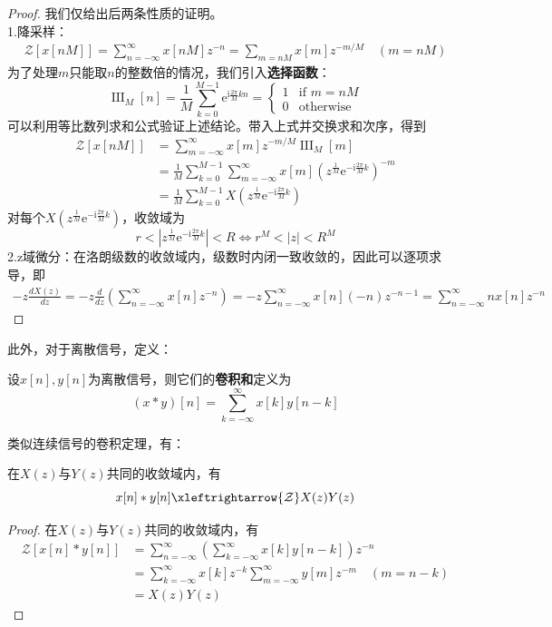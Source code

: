 \documentclass{ctexbook}
\newcommand{\shah}{\operatorname{III}}
\begin{document}
\begin{proof}
    我们仅给出后两条性质的证明。\\
    1.降采样：
    \begin{align*}
        \mathcal{Z}\left[x[nM]\right]=\sum_{n=-\infty}^{\infty}x[nM]z^{-n}=\sum_{m=nM}x[m]z^{-m/M}\quad(m=nM)
    \end{align*}
    为了处理$m$只能取$n$的整数倍的情况，我们引入\textbf{选择函数}：
    \[\shah_M[n]=\frac{1}{M}\sum_{k=0}^{M-1}\mathrm{e}^{\mathrm{i}\frac{2\pi}{M}kn}=\begin{cases}
        1 & \text{if }m=nM\\
        0 & \text{otherwise}
    \end{cases}\]
    可以利用等比数列求和公式验证上述结论。带入上式并交换求和次序，得到
    \begin{align*}
        \mathcal{Z}\left[x[nM]\right]&=\sum_{m=-\infty}^{\infty}x[m]z^{-m/M}\shah_M[m]\\
        &=\frac{1}{M}\sum_{k=0}^{M-1}\sum_{m=-\infty}^{\infty}x[m]\left(z^{\frac{1}{M}}\mathrm{e}^{-\mathrm{i}\frac{2\pi}{M}k}\right)^{-m}\\
        &=\frac{1}{M}\sum_{k=0}^{M-1}X\left(z^{\frac{1}{M}}\mathrm{e}^{-\mathrm{i}\frac{2\pi}{M}k}\right)
    \end{align*}
    对每个$X\left(z^{\frac{1}{M}}\mathrm{e}^{-\mathrm{i}\frac{2\pi}{M}k}\right)$，收敛域为
    \[r<\left|z^{\frac{1}{M}}\mathrm{e}^{-\mathrm{i}\frac{2\pi}{M}k}\right|< R\iff r^{M}<|z|<R^{M}\]
    2.z域微分：在洛朗级数的收敛域内，级数时内闭一致收敛的，因此可以逐项求导，即
    \begin{align*}
        -z\frac{dX(z)}{dz}=-z\frac{d}{dz}\left(\sum_{n=-\infty}^{\infty}x[n]z^{-n}\right)=-z\sum_{n=-\infty}^{\infty}x[n](-n)z^{-n-1}=\sum_{n=-\infty}^{\infty}n x[n]z^{-n}
    \end{align*}
\end{proof}

此外，对于离散信号，定义\cite{signal_systems}：
\begin{definition}[卷积和]
    设$x[n],y[n]$为离散信号，则它们的\textbf{卷积和}定义为
    \[(x*y)[n]=\sum_{k=-\infty}^{\infty}x[k]y[n-k]\]
\end{definition}
类似连续信号的卷积定理，有：
\begin{proposition}[卷积和定理]
    在$X(z)$与$Y(z)$共同的收敛域内，有
    \[x[n]*y[n]\xleftrightarrow{\mathcal{Z}} X(z)Y(z)\]
\end{proposition}
\begin{proof}
    在$X(z)$与$Y(z)$共同的收敛域内，有
    \begin{align*}
        \mathcal{Z} \left[x[n]*y[n]\right]&=\sum_{n=-\infty}^{\infty}\left(\sum_{k=-\infty}^{\infty}x[k]y[n-k]\right)z^{-n}\\
        &=\sum_{k=-\infty}^{\infty}x[k]z^{-k}\sum_{m=-\infty}^{\infty}y[m]z^{-m}\quad(m=n-k)\\
        &=X(z)Y(z)
    \end{align*}
\end{proof}
\end{document}
